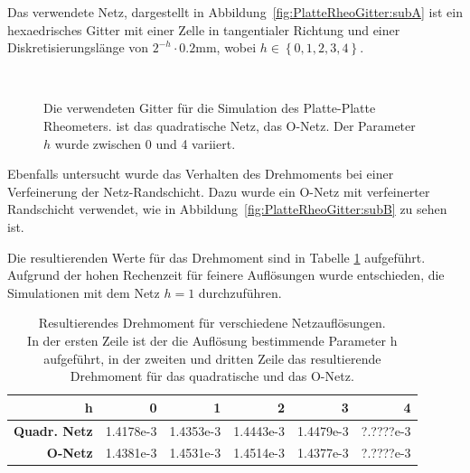 Das verwendete Netz, dargestellt in Abbildung~\ref{fig:PlatteRheoGitter:subA} ist ein hexaedrisches Gitter mit einer Zelle in tangentialer Richtung und einer Diskretisierungslänge von $2^{-h} \cdot 0.2\mbox{mm}$, wobei $h\in\left\{ 0,1,2,3,4 \right\}$.
%
\begin{figure}
    \centering
    \\
    \caption{Die verwendeten Gitter für die Simulation des Platte-Platte Rheometers.  ist das quadratische Netz,  das O-Netz.
    Der Parameter $h$ wurde zwischen 0 und 4 variiert.}
    \label{fig:PlatteRheoGitter}
\end{figure}
%

Ebenfalls untersucht wurde das Verhalten des Drehmoments bei einer Verfeinerung der Netz-Randschicht. Dazu wurde ein O-Netz mit verfeinerter Randschicht verwendet, wie in Abbildung~\ref{fig:PlatteRheoGitter:subB} zu sehen ist.

Die resultierenden Werte für das Drehmoment sind in Tabelle \ref{fig:ResultingTorque} aufgeführt. Aufgrund der hohen Rechenzeit für feinere Auflösungen wurde entschieden, die Simulationen mit dem Netz $h=1$ durchzuführen.
%
\begin{table}
    \centering
    \begin{tabular}{r r r r r r}
        \textbf{h} \vline & 0 & 1 & 2 & 3 & 4\\
        \hline
        \textbf{Quadr. Netz} \vline & 1.4178e-3 & 1.4353e-3 & 1.4443e-3 & 1.4479e-3 & ?.????e-3\\
        \textbf{O-Netz} \vline & 1.4381e-3 & 1.4531e-3 & 1.4514e-3 & 1.4377e-3 & ?.????e-3
    \end{tabular}
    \caption{Resultierendes Drehmoment für verschiedene Netzauflösungen.\\
    In der ersten Zeile ist der die Auflösung bestimmende Parameter h aufgeführt, in der zweiten und dritten Zeile das resultierende Drehmoment für das quadratische und das O-Netz.}
    \label{fig:ResultingTorque}
\end{table}
%
